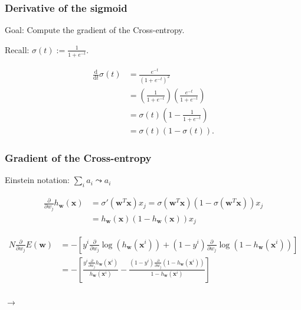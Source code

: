 \documentclass{beamer}
\begin{document}
	\begin{frame}
		\frametitle{Derivative of the sigmoid}
		Goal: Compute the gradient of the Cross-entropy.
		
		\vspace{5mm}
		
		Recall: $\sigma(t) := \frac{1}{1+e^{-t}}$.
		
		\begin{align*}
			\frac{\textrm{d}}{\textrm{d}t} \sigma(t) &= \frac{e^{-t}}{(1 + e^{-t})^2}\\
			&= \left(\frac{1}{1 + e^{-t}}\right)\left(\frac{e^{-t}}{1 + e^{-t}}\right)\\
			&= \sigma(t)\left(1 - \frac{1}{1 + e^{-t}}\right)\\
			&= \sigma(t)(1 - \sigma(t)).
		\end{align*}
		
	\end{frame}

	\begin{frame}
		\frametitle{Gradient of the Cross-entropy}
		
		Einstein notation: $\sum_{i} a_i \leadsto a_i$
		
		\begin{align*}
			\frac{\partial}{\partial w_j} h_{\bm{w}}(\bm{x}) &= \sigma'(\bm{w}^T \bm{x}) x_j = \sigma(\bm{w}^T \bm{x})(1 - \sigma(\bm{w}^T \bm{x}))x_j\\
			 &= h_{\bm{w}}(\bm{x})(1 - h_{\bm{w}}(\bm{x}))x_j 
		\end{align*}
		
		\begin{align*}
			N\frac{\partial}{\partial w_j} E(\bm{w}) &= - \left[y^i	\frac{\partial}{\partial w_j}\log(h_{\bm{w}}(\bm{x}^i)) + (1-y^i)	\frac{\partial}{\partial w_j}\log(1-h_{\bm{w}}(\bm{x}^i))\right]\\
			&= - \left[\frac{y^i \frac{\partial}{\partial w_j}h_{\bm{w}}(\bm{x}^i)}{h_{\bm{w}}(\bm{x}^i)} - \frac{(1-y^i) \frac{\partial}{\partial w_j}(1 -h_{\bm{w}}(\bm{x}^i))}{1-h_{\bm{w}}(\bm{x}^i)}\right]\\
		\end{align*}
	
	\mbox{}\hfill $\rightarrow$
	
	\end{frame}
\end{document}

